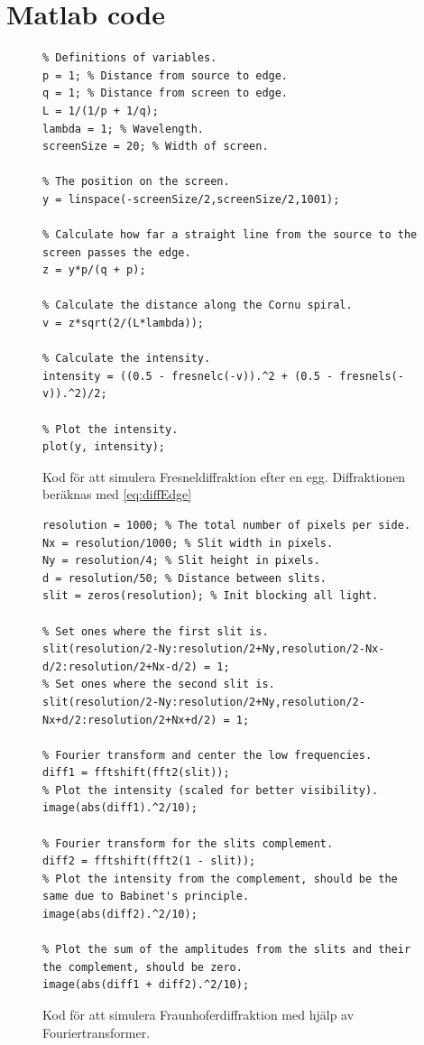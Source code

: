 \documentclass[a4paper]{article}
\begin{document}
 {}
 

\appendix

\section{Matlab code}

\FloatBarrier

  \begin{figure}[ht]
  \centering
  \begin{lstlisting}
% Definitions of variables.
p = 1; % Distance from source to edge.
q = 1; % Distance from screen to edge.
L = 1/(1/p + 1/q);
lambda = 1; % Wavelength.
screenSize = 20; % Width of screen.

% The position on the screen.
y = linspace(-screenSize/2,screenSize/2,1001);

% Calculate how far a straight line from the source to the screen passes the edge.
z = y*p/(q + p);

% Calculate the distance along the Cornu spiral.
v = z*sqrt(2/(L*lambda));

% Calculate the intensity.
intensity = ((0.5 - fresnelc(-v)).^2 + (0.5 - fresnels(-v)).^2)/2;

% Plot the intensity.
plot(y, intensity);
  \end{lstlisting}
  \caption{Kod för att simulera Fresneldiffraktion efter en egg. Diffraktionen beräknas med \eqref{eq:diffEdge}}
  \end{figure}

  \begin{figure}[ht]
  \centering
  \begin{lstlisting}
resolution = 1000; % The total number of pixels per side.
Nx = resolution/1000; % Slit width in pixels.
Ny = resolution/4; % Slit height in pixels.
d = resolution/50; % Distance between slits.
slit = zeros(resolution); % Init blocking all light.

% Set ones where the first slit is.
slit(resolution/2-Ny:resolution/2+Ny,resolution/2-Nx-d/2:resolution/2+Nx-d/2) = 1;
% Set ones where the second slit is.
slit(resolution/2-Ny:resolution/2+Ny,resolution/2-Nx+d/2:resolution/2+Nx+d/2) = 1;

% Fourier transform and center the low frequencies.
diff1 = fftshift(fft2(slit));
% Plot the intensity (scaled for better visibility).
image(abs(diff1).^2/10);

% Fourier transform for the slits complement.
diff2 = fftshift(fft2(1 - slit));
% Plot the intensity from the complement, should be the same due to Babinet's principle.
image(abs(diff2).^2/10);

% Plot the sum of the amplitudes from the slits and their the complement, should be zero.
image(abs(diff1 + diff2).^2/10);
  \end{lstlisting}
  \caption{Kod för att simulera Fraunhoferdiffraktion med hjälp av Fouriertransformer.}
  \end{figure}
\end{document}
